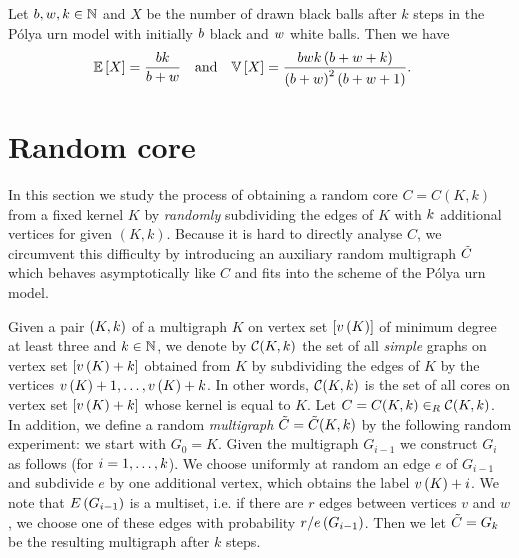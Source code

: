 \begin{thm}\label{CBthm:polya2}
Let $b, w, k \in \mathbb{N}$ and $X$ be the number of drawn black balls after $k$ steps in the P\'olya urn model with initially $b$ black and $w$ white balls. Then we have
\begin{align*}
\mathbb{E}\left[X\right]&=\frac{bk}{b+w} \quad \text{and}\quad 
\mathbb{V}\left[X\right]=\frac{bwk\left(b+w+k\right)}{\left(b+w\right)^2\left(b+w+1\right)}.
\end{align*}
\end{thm}

\section{Random core}\label{CBsec:CoreLabelled}
In this section we study the process of obtaining a random core $C=C(K,k)$ from a fixed kernel $K$ by {\em randomly} subdividing the edges of $K$ with $k$ additional vertices for given $(K,k)$. Because it is hard to directly analyse $C$, we circumvent this difficulty by introducing an auxiliary random multigraph $\tilde{C}$ which behaves asymptotically like $C$ and fits into the scheme of the P\'olya urn model.

\begin{definition}\label{CBdef:random_core}
Given a pair $(K,k)$ of a multigraph $K$ on vertex set $[v\left({K}\right)]$ of minimum degree at least three and $k\in \mathbb{N}$, we denote by $\mathcal{C}(K,k)$ the set of all {\em simple} graphs on vertex set $[v\left({K}\right)+k]$ obtained from $K$ by subdividing the edges of $K$ by the vertices $v\left({K}\right)+1,\dots, v\left({K}\right)+k$. In other words, $\mathcal{C}(K,k)$ is the set of all cores on vertex set $[v\left({K}\right)+k]$ whose kernel is equal to $K$. Let $C=C(K,k)\in_R \mathcal{C}(K,k)$. In addition, we define a random {\em multigraph} $\tilde{C}=\tilde{C}(K,k)$ by the following random experiment: we start with $G_0=K$. Given the multigraph $G_{i-1}$ we construct $G_{i}$ as follows (for $i=1, \ldots, k$). We choose uniformly at random an edge $e$ of $G_{i-1}$ and subdivide $e$ by one additional vertex, which obtains the label $v\left({K}\right)+i$. We note that $E\left(G_{i-1}\right)$ is a multiset, i.e. if there are $r$ edges between vertices $v$ and $w$, we choose one of these edges with probability $r/e\left({G_{i-1}}\right)$. Then we let $\tilde{C}=G_{k}$ be the resulting multigraph after $k$ steps.
\end{definition}

